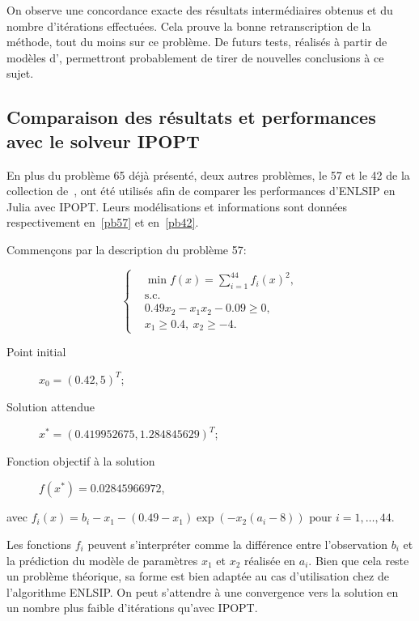 On observe une concordance exacte des résultats intermédiaires obtenus et du nombre d'itérations effectuées. Cela prouve la bonne retranscription de 
la méthode, tout du moins sur ce problème. De futurs tests, réalisés à partir de modèles d'\HQ, permettront probablement de tirer de nouvelles conclusions à ce sujet.


\subsection{Comparaison des résultats et performances avec le solveur IPOPT}\label{compa_ipopt}

En plus du problème 65 déjà présenté, deux autres problèmes, le 57 et le 42 de la collection de~\citet{hockschi}, ont été utilisés afin de comparer les performances d'ENLSIP en Julia avec IPOPT.
Leurs modélisations et informations sont données respectivement en~\eqref{pb57} et en~\eqref{pb42}.

Commençons par la description du problème 57:

\begin{equation}\label{pb57}
 \left\{  
\begin{aligned} 
&\min f(x)= \sum\limits_{i=1}^{44} f_i(x)^2,\\ 
&\text{s.c.}\\
&0.49x_2-x_1x_2-0.09 \geq 0,\\
&x_1\geq 0.4,\  x_2 \geq -4.
\end{aligned} \right. 
\end{equation}

\begin{description}
    \item[Point initial] $x_0 = (0.42,5)^T$;
    \item[Solution attendue] $x^* = (0.419952675,1.284845629)^T$;
    \item[Fonction objectif à la solution] $f(x^*) =0.02845966972$,
\end{description}

avec $f_i(x) = b_i - x_1 - (0.49-x_1)\exp(-x_2(a_i-8)) \text{ pour }i=1,\ldots,44$. 

Les fonctions $f_i$ peuvent s'interpréter comme la différence entre l'observation $b_i$ et la prédiction du modèle de paramètres $x_1$ et $x_2$ réalisée en $a_i$.
Bien que cela reste un problème théorique, sa forme est bien adaptée au cas d'utilisation chez \HQ de l'algorithme ENLSIP. On peut s'attendre à une convergence vers la solution en un nombre plus faible 
d'itérations qu'avec IPOPT.

